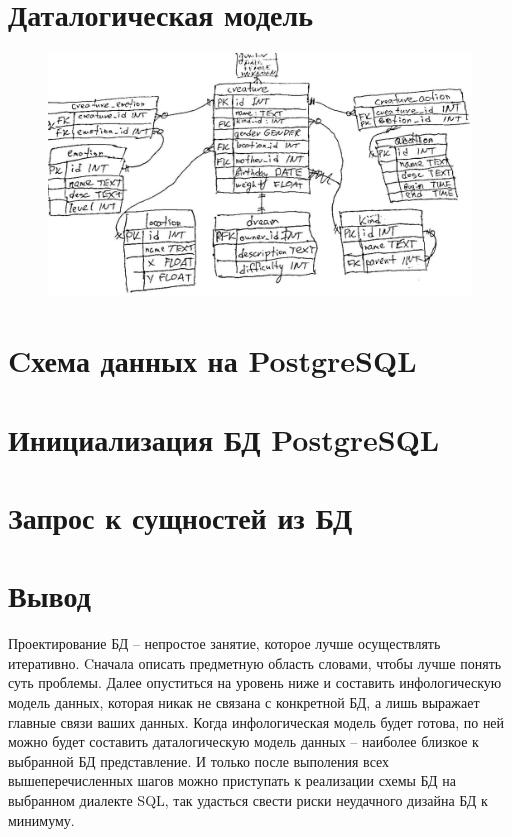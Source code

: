 \documentclass{article}
\begin{document}
\section{Даталогическая модель}

\begin{figure}[th]
    \includegraphics[scale=0.2]{../fig/er.jpg}
    \centering
\end{figure}

\section{Cхема данных на PostgreSQL}



\section{Инициализация БД PostgreSQL}



\section{Запрос к сущностей из БД}



\section{Вывод}

Проектирование БД -- непростое занятие, которое
лучше осуществлять итеративно. Cначала
описать предметную область словами, чтобы лучше
понять суть проблемы. Далее опуститься на уровень
ниже и составить инфологическую модель данных,
которая никак не связана с конкретной БД, а
лишь выражает главные связи ваших данных.
Когда инфологическая модель будет готова,
по ней можно будет составить даталогическую
модель данных -- наиболее близкое к выбранной
БД представление. И только после выполения всех
вышеперечисленных шагов можно приступать
к реализации схемы БД на выбранном диалекте SQL,
так удасться свести риски неудачного дизайна БД
к минимуму.
\end{document}
